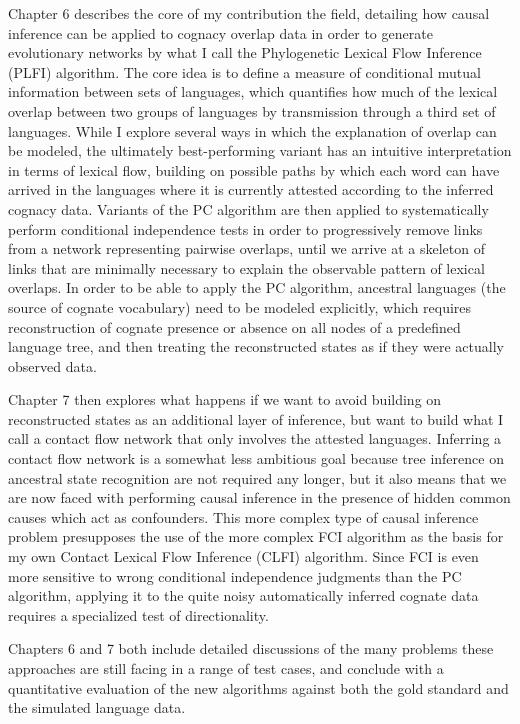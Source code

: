 Chapter 6 describes the core of my contribution the field, detailing how causal inference can be applied to cognacy overlap data in order to generate evolutionary networks by what I call the Phylogenetic Lexical Flow Inference (PLFI) algorithm. The core idea is to define a measure of conditional mutual information between sets of languages, which quantifies how much of the lexical overlap between two groups of languages by transmission through a third set of languages. While I explore several ways in which the explanation of overlap can be modeled, the ultimately best-performing variant has an intuitive interpretation in terms of lexical flow, building on possible paths by which each word can have arrived in the languages where it is currently attested according to the inferred cognacy data. Variants of the PC algorithm are then applied to systematically perform conditional independence tests in order to progressively remove links from a network representing pairwise overlaps, until we arrive at a skeleton of links that are minimally necessary to explain the observable pattern of lexical overlaps. In order to be able to apply the PC algorithm, ancestral languages (the source of cognate vocabulary) need to be modeled explicitly, which requires reconstruction of cognate presence or absence on all nodes of a predefined language tree, and then treating the reconstructed states as if they were actually observed data.

Chapter 7 then explores what happens if we want to avoid building on reconstructed states as an additional layer of inference, but want to build what I call a contact flow network that only involves the attested languages. Inferring a contact flow network is a somewhat less ambitious goal because tree inference on ancestral state recognition are not required any longer, but it also means that we are now faced with performing causal inference in the presence of hidden common causes which act as confounders. This more complex type of causal inference problem presupposes the use of the more complex FCI algorithm as the basis for my own Contact Lexical Flow Inference (CLFI) algorithm. Since FCI is even more sensitive to wrong conditional independence judgments than the PC algorithm, applying it to the quite noisy automatically inferred cognate data requires a specialized test of directionality.

Chapters 6 and 7 both include detailed discussions of the many problems these approaches are still facing in a range of test cases, and conclude with a quantitative evaluation of the new algorithms against both the gold standard and the simulated language data.


